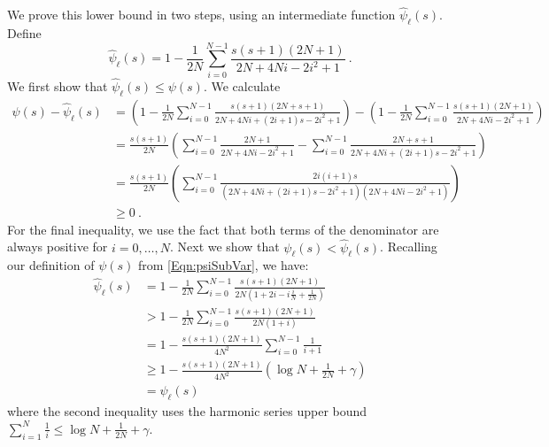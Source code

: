 \documentclass[11pt]{article}
\numberwithin{equation}{section}
\theoremstyle{definition}
\theoremstyle{definition}
\theoremstyle{definition}
\newcommand{\1}{\mathbf{1}}
\newcommand{\psiL}{\psi_{\ell}}
\newcommand{\psiLHat}{\hat{\psi}_\ell}
\newcommand{\harmonicUpperBd}{\log N + \frac{1}{2N} + \gamma}
\newcommand{\subVar}{s}
\begin{document}
    We prove this lower bound in two steps, using an intermediate function $\psiLHat(\subVar)$. Define 
    \begin{equation*}
        \psiLHat(\subVar) = 1-\frac{1}{2N}\sum_{i=0}^{N-1}\frac{\subVar(\subVar+1)(2N+1)}{2N+4Ni-2i^2+1} \ .
    \end{equation*}
    We first show that $\psiLHat(s) \leq \psi(s)$.
    We calculate
    \begin{align*}
            \psi(\subVar) - \psiLHat(s) &= \left(1 - \frac{1}{2N}\sum_{i=0}^{N-1} \frac{\subVar(\subVar+1)(2N+\subVar+1)}{2N+4Ni+(2i+1)\subVar-2i^2+1}\right) - \left(1-\frac{1}{2N}\sum_{i=0}^{N-1}\frac{\subVar(\subVar+1)(2N+1)}{2N+4Ni-2i^2+1}\right) \\
            & =\frac{\subVar(\subVar+1)}{2N} \left(\sum_{i=0}^{N-1}\frac{2N+1}{2N+4Ni-2i^2+1} - \sum_{i=0}^{N-1} \frac{2N+\subVar+1}{2N+4Ni+(2i+1)\subVar-2i^2+1} \right) \\
            & = \frac{\subVar(\subVar+1)}{2N} \left(\sum_{i=0}^{N-1} \frac{2i(i+1)\subVar}{(2N+4Ni+(2i+1)\subVar-2i^2+1)(2N+4Ni-2i^2+1)} \right)\\
            & \geq 0 \ .
    \end{align*}
    For the final inequality, we use the fact that both terms of the denominator are always positive for $i=0,\dots,N$.
    Next we show that $\psiL(\subVar) < \psiLHat(\subVar)$. Recalling our definition of $\psi(s)$ from \eqref{Eqn:psiSubVar}, we have:
    \begin{align*}
            \psiLHat(\subVar) & = 1-\frac{1}{2N}\sum_{i=0}^{N-1}\frac{\subVar(\subVar+1)(2N+1)}{2N(1+2i-i\frac{i}{N}+\frac{1}{2N})}\\
            & > 1-\frac{1}{2N}\sum_{i=0}^{N-1}\frac{\subVar(\subVar+1)(2N+1)}{2N(1+i)} \\
            & = 1-\frac{\subVar(\subVar+1)(2N+1)}{4N^2}\sum_{i=0}^{N-1} \frac{1}{i+1} \\
            & \geq 1-\frac{\subVar(\subVar+1)(2N+1)}{4N^2}\left( \harmonicUpperBd \right)\\
            & = \psiL(\subVar)
    \end{align*}
    where the second inequality uses the harmonic series upper bound $\sum_{i=1}^N \frac{1}{i} \leq \harmonicUpperBd$.
\end{document}
